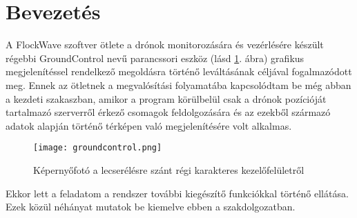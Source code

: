 \section{Bevezetés}

A FlockWave szoftver ötlete a drónok monitorozására és vezérlésére készült
régebbi GroundControl nevű parancssori eszköz (lásd \ref{fig:groundcontrol}.
ábra) grafikus megjelenítéssel rendelkező megoldásra történő leváltásának
céljával fogalmazódott meg. Ennek az ötletnek a megvalósítási folyamatába
kapcsolódtam be még abban a kezdeti szakaszban, amikor a program körülbelül csak
a drónok pozícióját tartalmazó szerverről érkező csomagok feldolgozására és az
ezekből származó adatok alapján történő térképen való megjelenítésére volt
alkalmas.

\begin{figure}[h!]
  \texttt{[image: groundcontrol.png]}
  \caption{Képernyőfotó a lecserélésre szánt régi karakteres kezelőfelületről}
  \label{fig:groundcontrol}
\end{figure}

\noindent Ekkor lett a feladatom a rendszer további kiegészítő funkciókkal
történő ellátása. Ezek közül néhányat mutatok be kiemelve ebben a
szakdolgozatban.
